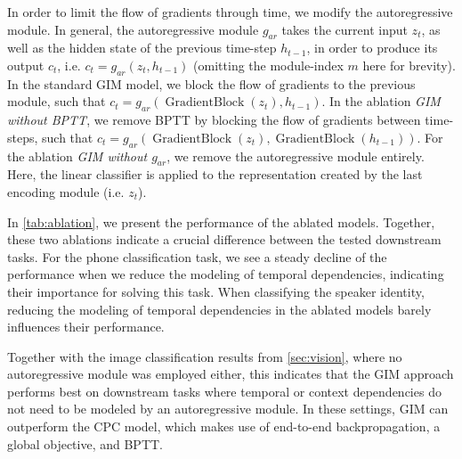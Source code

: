 \documentclass{article}
\DeclareMathOperator{\gradblock}{GradientBlock}
\begin{document}
In order to limit the flow of gradients through time, we modify the autoregressive module. In general, the autoregressive module $g_{ar}$ takes the current input $z_t$, as well as the hidden state of the previous time-step $h_{t-1}$, in order to produce its output $c_t$, i.e. $c_t = g_{ar}(z_t, h_{t-1})$ (omitting the module-index $m$ here for brevity). In the standard GIM model, we block the flow of gradients to the previous module, such that $c_t = g_{ar}(\gradblock(z_t), h_{t-1})$. In the ablation \textit{GIM without BPTT}, we remove BPTT by blocking the flow of gradients between time-steps, such that $c_t = g_{ar}(\gradblock(z_t), \gradblock(h_{t-1}))$. For the ablation \textit{GIM without $g_{ar}$}, we remove the autoregressive module entirely. Here, the linear classifier is applied to the representation created by the last encoding module (i.e. $z_t$).

In \cref{tab:ablation}, we present the performance of the ablated models. Together, these two ablations indicate a crucial difference between the tested downstream tasks. For the phone classification task, we see a steady decline of the performance when we reduce the modeling of temporal dependencies, indicating their importance for solving this task. When classifying the speaker identity, reducing the modeling of temporal dependencies in the ablated models barely influences their performance.

Together with the image classification results from \cref{sec:vision}, where no autoregressive module was employed either, this indicates that the GIM approach performs best on downstream tasks where temporal or context dependencies do not need to be modeled by an autoregressive module. In these settings, GIM can outperform the CPC model, which makes use of end-to-end backpropagation, a global objective, and BPTT. 
\end{document}
